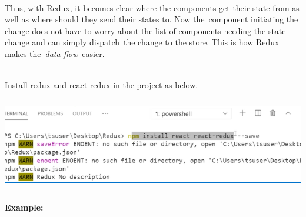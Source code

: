\documentclass{article}
\begin{document}
\noindent \\
Thus, with Redux, it becomes clear where the components get their state from as well as where should they send their states to. Now the~component initiating the change does not have to worry about the list of components needing the state change and can simply dispatch~the change to the store. This is how Redux makes the~\textit{data flow}~easier.

\noindent 

\noindent \\
Install redux and react-redux in the project as below.

\noindent \textbf{}

\begin{center}
	\noindent \includegraphics*[width=6.23in, height=1.62in]{IMG-11-05}\textbf{}
\end{center}
\newpage
\noindent \textbf{Example:}

\noindent \textbf{}
\end{document}

